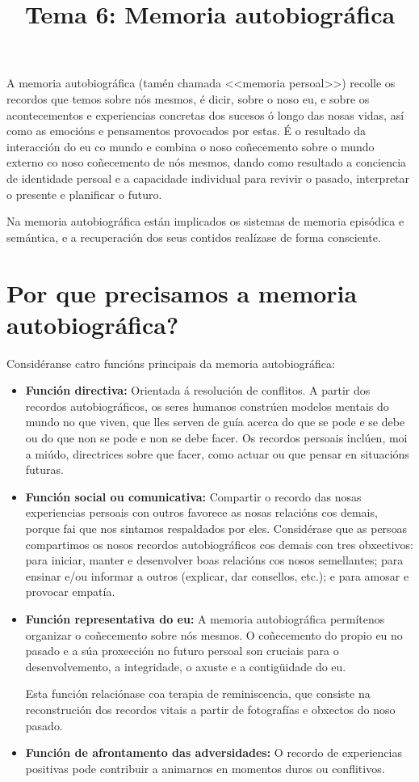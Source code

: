 \documentclass[a4paper,11pt]{article}
\title{Tema 6: Memoria autobiográfica}
\date{}
\begin{document}
  

\maketitle

A memoria autobiográfica (tamén chamada <<memoria persoal>>) recolle os recordos que temos sobre nós mesmos, é dicir, sobre o noso eu, e sobre os acontecementos e experiencias concretas dos sucesos ó longo das nosas vidas, así como as emocións e pensamentos provocados por estas. É o resultado da interacción do eu co mundo e combina o noso coñecemento sobre o mundo externo co noso coñecemento de nós mesmos, dando como resultado a conciencia de identidade persoal e a capacidade individual para revivir o pasado, interpretar o presente e planificar o futuro.

Na memoria autobiográfica están implicados os sistemas de memoria episódica e semántica, e a recuperación dos seus contidos realízase de forma consciente.

\section{Por que precisamos a memoria autobiográfica?}
Considéranse catro funcións principais da memoria autobiográfica:

\begin{itemize}
	\item \textbf{Función directiva:} Orientada á resolución de conflitos. A partir dos recordos
	autobiográficos, os seres humanos constrúen modelos mentais do mundo no que viven, que lles
	serven de guía acerca do que se pode e se debe ou do que non se pode e non se debe facer. Os
	recordos persoais inclúen, moi a miúdo, directrices sobre que facer, como actuar ou que pensar
	en situacións futuras.
	\item \textbf{Función social ou comunicativa:} Compartir o recordo das nosas experiencias 
	persoais con outros favorece as nosas relacións cos demais, porque fai que nos sintamos 
	respaldados por eles. Considérase que as persoas compartimos os nosos recordos autobiográficos
	cos demais con tres obxectivos: para iniciar, manter e desenvolver boas relacións cos nosos
	semellantes; para ensinar e/ou informar a outros (explicar, dar consellos, etc.); e para amosar
	e provocar empatía.
	\item \textbf{Función representativa do eu:} A memoria autobiográfica permítenos organizar o
	coñecemento sobre nós mesmos. O coñecemento do propio eu no pasado e a súa proxección no futuro
	persoal son cruciais para o desenvolvemento, a integridade, o axuste e a contigüidade do eu.
	
	Esta función relaciónase coa terapia de reminiscencia, que consiste na reconstrución dos 
	recordos vitais a partir de fotografías e obxectos do noso pasado. 
	\item \textbf{Función de afrontamento das adversidades:} O recordo de experiencias positivas 
	pode contribuir a animarnos en momentos duros ou conflitivos.
\end{itemize}
\end{document}
